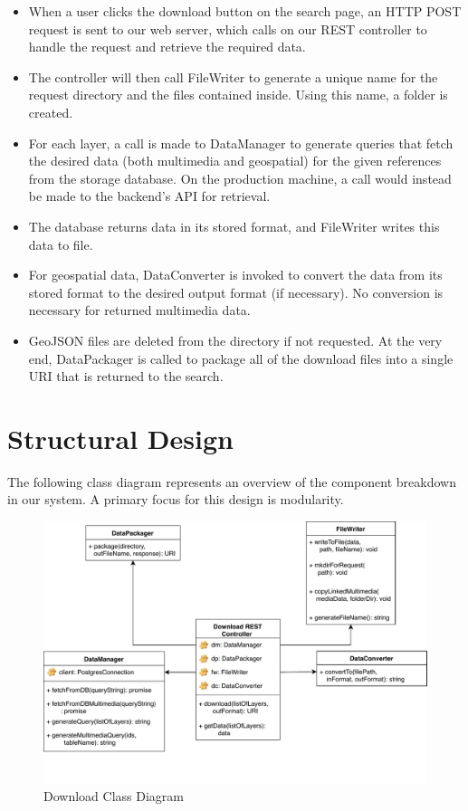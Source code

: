 \documentclass{article}
\begin{document}
\begin{itemize}
	\item When a user clicks the download button on the search page, an HTTP 
	POST request is sent to our web server, which calls on our REST controller 
	to handle the request and retrieve the required data. 
	\item The controller will then call FileWriter to generate a unique 
	name for the request directory and the files contained inside. Using this 
	name, a folder is created. 
	\item For each layer, a call is made to DataManager to generate queries 
	that fetch the desired data (both multimedia and geospatial) for the given 
	references from the storage database. On the production machine, a call 
	would instead be made to the backend's API for retrieval. 
	\item The database returns data in its stored format, and 
	FileWriter writes this data to file.
	\item For geospatial data, DataConverter is invoked to convert the data  
	from its stored format to the desired output format (if necessary). No 
	conversion is necessary for returned multimedia data.
	\item GeoJSON files are deleted from the directory if not requested. 
	At the very end, DataPackager is called to package all of the 
	download files into a single URI that is returned to the search.

\end{itemize}

\clearpage

\section{Structural Design}

The following class diagram represents an overview of the component breakdown in our system. 
A primary focus for this design is modularity.  

\begin{figure}[H]
	\begin{center}
		\caption{Download Class Diagram}
		\includegraphics[width=\textwidth]{images/class_diagram.pdf}
	\end{center}
\end{figure}
\end{document}
